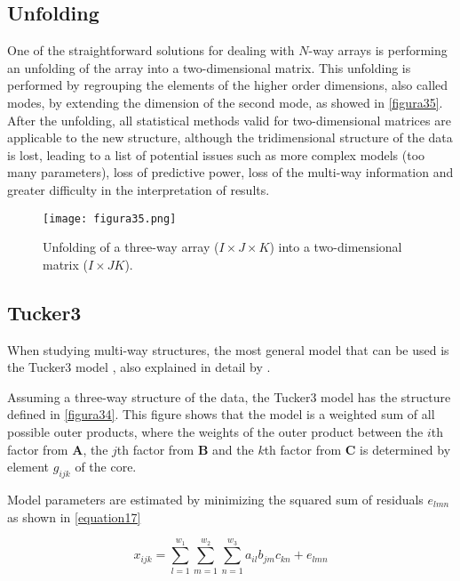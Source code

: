 \subsection{Unfolding}
One of the straightforward solutions for dealing with $N$-way arrays is performing an unfolding of the array into a two-dimensional matrix. This unfolding is performed by regrouping the elements of the higher order dimensions, also called modes, by extending the dimension of the second mode, as showed in \autoref{figura35}. After the unfolding, all statistical methods valid for two-dimensional matrices are applicable to the new structure, although the tridimensional structure of the data is lost, leading to a list of potential issues such as more complex models (too many parameters), loss of predictive power, loss of the multi-way information and greater difficulty in the interpretation of results.

\begin{figure}[hbtp]
\centering
\texttt{[image: figura35.png]}
\caption[Unfolding of a three-way array into a two-dimensional matrix]{Unfolding of a three-way array ($I \times J \times K$) into a two-dimensional matrix ($I \times JK$).}
\label{figura35}
\end{figure}


\subsection{Tucker3}
When studying multi-way structures, the most general model that can be used is the Tucker3 model \parencite{tucker1966some}, also explained in detail by \textcite{kiers2001three}.

Assuming a three-way structure of the data, the Tucker3 model has the structure defined in \autoref{figura34}. This figure shows that the model is a weighted sum of all possible outer products, where the weights of the outer product between the $i$th factor from \textbf{A}, the $j$th factor from \textbf{B} and the $k$th factor from \textbf{C} is determined by element $g_{ijk}$ of the core. 

Model parameters are estimated by minimizing the squared sum of residuals $e_{lmn}$ as shown in \autoref{equation17}

\begin{equation}
x_{ijk}=\sum\limits_{l=1}^{w_1} \sum\limits_{m=1}^{w_2} \sum\limits_{n=1}^{w_3}a_{il}b_{jm}c_{kn}+e_{lmn}
\label{equation17}
\end{equation}

